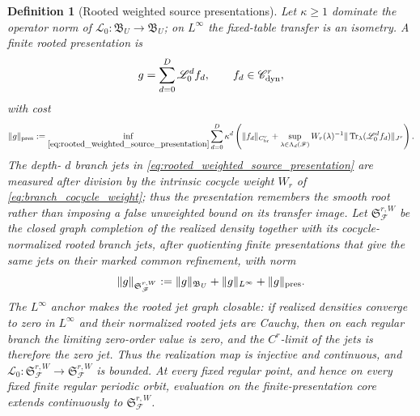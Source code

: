 \documentclass[11pt]{amsart}
\theoremstyle{compactplain}
\theoremstyle{compactdefinition}
\newtheorem*{definition*}{Definition}
\theoremstyle{compactremark}
\newcommand{\Ltransfer}{\mathscr L}
\begin{document}
\begin{definition*}[Rooted weighted source presentations]
Let \(\kappa\ge1\) dominate the operator norm of
\(\Ltransfer_0:\mathfrak B_U\to\mathfrak B_U\); on \(L^\infty\) the
fixed-table transfer is an isometry.  A finite rooted presentation is
\begin{equation}
\label{eq:rooted_weighted_source_presentation}
 g=\sum_{d=0}^D\Ltransfer_0^df_d,
 \qquad f_d\in\mathscr C_{\rm dyn}^r,
\end{equation}
with cost
\begin{equation}
\label{eq:rooted_weighted_source_cost}
 \|g\|_{\rm pres}
 :=\inf_{\eqref{eq:rooted_weighted_source_presentation}}
   \sum_{d=0}^D\kappa^d
   \left(
    \|f_d\|_{C_{\rm br}^r}
    +\sup_{\lambda\in\Lambda_d(\mathscr F)}
      W_r(\lambda)^{-1}
      \|\operatorname{Tr}_{\lambda}(\Ltransfer_0^df_d)\|_{J^r}
   \right).
\end{equation}
The depth-
\(d\) branch jets in \eqref{eq:rooted_weighted_source_presentation} are
measured after division by the intrinsic cocycle weight \(W_r\) of
\eqref{eq:branch_cocycle_weight}; thus the presentation remembers the smooth
root rather than imposing a false unweighted bound on its transfer image.
Let \(\mathfrak S_{\mathscr F}^{r,W}\) be the closed graph completion of the
realized density together with its cocycle-normalized rooted branch jets,
after quotienting finite presentations that give the same jets on their
marked common refinement, with norm
\begin{equation}
\label{eq:weighted_source_presentation_norm}
 \|g\|_{\mathfrak S_{\mathscr F}^{r,W}}
 :=\|g\|_{\mathfrak B_U}+\|g\|_{L^\infty}+\|g\|_{\rm pres}.
\end{equation}
The \(L^\infty\) anchor makes the rooted jet graph closable: if realized
densities converge to zero in \(L^\infty\) and their normalized rooted jets
are Cauchy, then on each regular branch the limiting zero-order value is zero,
and the \(C^r\)-limit of the jets is therefore the zero jet.  Thus the
realization map is injective and continuous, and
\(\Ltransfer_0:\mathfrak S_{\mathscr F}^{r,W}\to
\mathfrak S_{\mathscr F}^{r,W}\) is bounded.  At every fixed regular point,
and hence on every fixed finite regular periodic orbit, evaluation on the
finite-presentation core extends continuously to
\(\mathfrak S_{\mathscr F}^{r,W}\).
\end{definition*}
\end{document}
